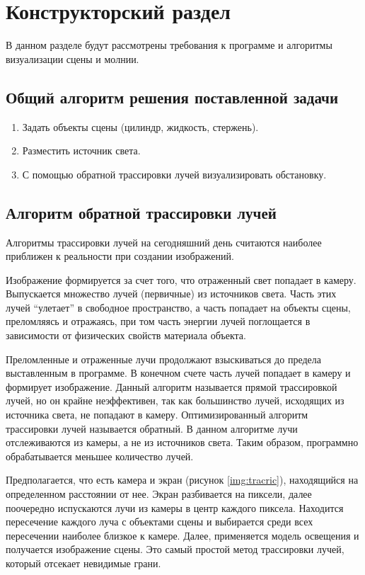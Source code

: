 \chapter{Конструкторский раздел}

В данном разделе будут рассмотрены требования к программе и алгоритмы визуализации сцены и молнии.


\section{Общий алгоритм решения поставленной задачи}
\begin{enumerate}
	\item Задать объекты сцены (цилиндр, жидкость, стержень).
	\item Разместить источник света.
	\item С помощью обратной трассировки лучей визуализировать обстановку.
\end{enumerate}


\section{Алгоритм обратной трассировки лучей}


Алгоритмы трассировки лучей на сегодняшний день считаются наиболее приближен к реальности при создании изображений. 

Изображение формируется за счет того, что отраженный свет попадает в камеру. Выпускается множество лучей (первичные) из источников света. Часть этих лучей “улетает” в свободное пространство, а часть попадает на объекты сцены, преломляясь и отражаясь, при том часть энергии лучей поглощается в зависимости от физических свойств материала объекта. 

Преломленные и отраженные лучи продолжают взыскиваться до предела выставленным в программе. В конечном счете часть лучей попадает в камеру и формирует изображение.
Данный алгоритм называется прямой трассировкой лучей, но он крайне неэффективен, так как большинство лучей, исходящих из источника света, не попадают в камеру. 
Оптимизированный алгоритм трассировки лучей называется обратный. 
В данном алгоритме лучи отслеживаются из камеры, а не из источников света. Таким образом, программно обрабатывается меньшее количество лучей.

Предполагается, что есть камера и экран (рисунок \ref{img:tracric}), находящийся на определенном расстоянии от нее. Экран разбивается на пиксели, далее поочередно испускаются лучи из камеры в центр каждого пиксела. Находится пересечение каждого луча с объектами сцены и выбирается среди всех пересечении наиболее близкое к камере. Далее, применяется модель освещения и получается изображение сцены. Это самый простой метод трассировки лучей, который отсекает невидимые грани.


